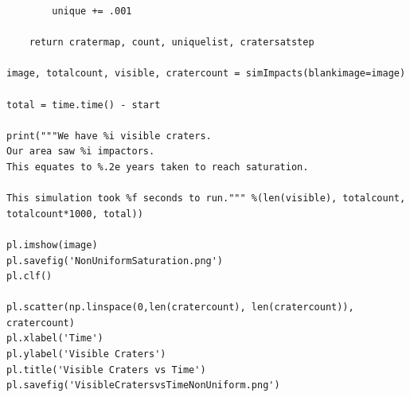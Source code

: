 \documentclass[11pt]{article}
\begin{document}
\begin{verbatim}
        unique += .001

    return cratermap, count, uniquelist, cratersatstep

image, totalcount, visible, cratercount = simImpacts(blankimage=image)

total = time.time() - start

print("""We have %i visible craters.
Our area saw %i impactors.
This equates to %.2e years taken to reach saturation.

This simulation took %f seconds to run.""" %(len(visible), totalcount, totalcount*1000, total))

pl.imshow(image)
pl.savefig('NonUniformSaturation.png')
pl.clf()

pl.scatter(np.linspace(0,len(cratercount), len(cratercount)), cratercount)
pl.xlabel('Time')
pl.ylabel('Visible Craters')
pl.title('Visible Craters vs Time')
pl.savefig('VisibleCratersvsTimeNonUniform.png')

\end{verbatim}
\end{document}
